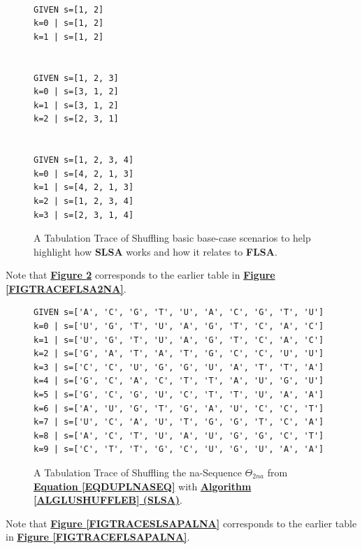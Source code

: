 \documentclass[a4paper, 18pt]{book} %
\begin{document}
\begin{figure}[H]
  \begin{center}
\LARGE
\begin{verbatim}

GIVEN s=[1, 2]
k=0 | s=[1, 2]
k=1 | s=[1, 2]


GIVEN s=[1, 2, 3]
k=0 | s=[3, 1, 2]
k=1 | s=[3, 1, 2]
k=2 | s=[2, 3, 1]


GIVEN s=[1, 2, 3, 4]
k=0 | s=[4, 2, 1, 3]
k=1 | s=[4, 2, 1, 3]
k=2 | s=[1, 2, 3, 4]
k=3 | s=[2, 3, 1, 4]
\end{verbatim}

   \caption{A Tabulation Trace of Shuffling basic base-case scenarios to help highlight how \textbf{SLSA} works and how it relates to \textbf{FLSA}.}
  \label{FIGTRACESLSASIMPLE}
  \end{center}
\end{figure}



Note that \textbf{\hyperref[FIGTRACESLSA2NA]{Figure \ref{FIGTRACESLSA2NA}}} corresponds to the earlier table in \textbf{\hyperref[FIGTRACEFLSA2NA]{Figure \ref{FIGTRACEFLSA2NA}}}.


\begin{figure}[H]
  \begin{center}
\Large
\begin{verbatim}
GIVEN s=['A', 'C', 'G', 'T', 'U', 'A', 'C', 'G', 'T', 'U']
k=0 | s=['U', 'G', 'T', 'U', 'A', 'G', 'T', 'C', 'A', 'C']
k=1 | s=['U', 'G', 'T', 'U', 'A', 'G', 'T', 'C', 'A', 'C']
k=2 | s=['G', 'A', 'T', 'A', 'T', 'G', 'C', 'C', 'U', 'U']
k=3 | s=['C', 'C', 'U', 'G', 'G', 'U', 'A', 'T', 'T', 'A']
k=4 | s=['G', 'C', 'A', 'C', 'T', 'T', 'A', 'U', 'G', 'U']
k=5 | s=['G', 'C', 'G', 'U', 'C', 'T', 'T', 'U', 'A', 'A']
k=6 | s=['A', 'U', 'G', 'T', 'G', 'A', 'U', 'C', 'C', 'T']
k=7 | s=['U', 'C', 'A', 'U', 'T', 'G', 'G', 'T', 'C', 'A']
k=8 | s=['A', 'C', 'T', 'U', 'A', 'U', 'G', 'G', 'C', 'T']
k=9 | s=['C', 'T', 'T', 'G', 'C', 'U', 'G', 'U', 'A', 'A']
\end{verbatim}

   \caption{A Tabulation Trace of Shuffling the na-Sequence $\Theta_{2na}$ from \textbf{\hyperref[EQDUPLNASEQ]{Equation \ref{EQDUPLNASEQ}}} with \textbf{\hyperref[ALGLUSHUFFLEB]{Algorithm \ref{ALGLUSHUFFLEB} (SLSA)}}.}
  \label{FIGTRACESLSA2NA}
  \end{center}
\end{figure}


Note that \textbf{\hyperref[FIGTRACESLSAPALNA]{Figure \ref{FIGTRACESLSAPALNA}}} corresponds to the earlier table in \textbf{\hyperref[FIGTRACEFLSAPALNA]{Figure \ref{FIGTRACEFLSAPALNA}}}.
\end{document}

